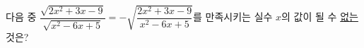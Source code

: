 다음 중 $\dfrac{\sqrt{2x^2+3x-9}}{\sqrt{x^2-6x+5}}=-\sqrt{\dfrac{2x^2+3x-9}{x^2-6x+5}}$를 만족시키는 실수 $x$의 값이 될 수 \underline{없는} 것은?
